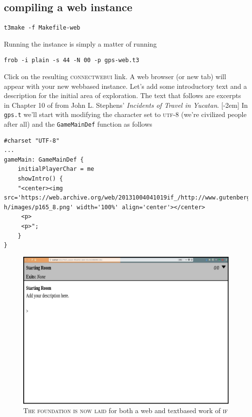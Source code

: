 \subsection{compiling a web instance}
\begin{lstlisting}
t3make -f Makefile-web
\end{lstlisting}
Running the instance is simply a matter of running
\begin{lstlisting}
frob -i plain -s 44 -N 00 -p gps-web.t3
\end{lstlisting}
Click on the resulting \textsc{connectwebui} link. A web browser (or new tab)
will appear with your new web\textendash based instance. Let's add some introductory text and a description for the initial area of exploration. The text that follows are excerpts in Chapter 10 of from John L. Stephens' \emph{Incidents of Travel in Yucatan}.
[-2em]
In \texttt{gps.t} we'll start
with modifying the character set to \textsc{utf-8} (we're civilized people after all) and the \texttt{GameMainDef} function as follows
\begin{lstlisting}
#charset "UTF-8"
...
gameMain: GameMainDef {
    initialPlayerChar = me
    showIntro() {
	"<center><img src='https://web.archive.org/web/20131004041019if_/http://www.gutenberg.org/files/33129/33129-h/images/p165_8.png' width='100%' align='center'></center>
	 <p>
	 <p>";
    }
}
\end{lstlisting}
\begin{figure}[h]                                                           
 \includegraphics[width=\linewidth]{./media/images/new_web_game.pdf}%
  \scriptsize{\textsc{\\The foundation is now laid } for both a web and
    text\textendash based work of \textsc{if}}
  \label{fig:new_web_game}%
\end{figure}
